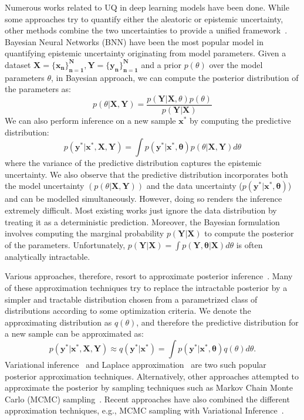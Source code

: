 Numerous works related to UQ in deep learning models have been done. While some approaches try to quantify either the aleatoric or epistemic uncertainty, other methods combine the two uncertainties to provide a unified framework~\cite{UncertDeepL, UncertDeepL2, UncertDeepNNSurvey}. Bayesian Neural Networks (BNN) have been the most popular model in quantifying epistemic uncertainty originating from model parameters. Given a dataset $\mathbf{X=\{x_n\}_{n=1}^N, Y=\{y_n\}_{n=1}^N}$ and a prior $p(\theta)$ over the model parameters $\theta$, in Bayesian approach, we can compute the posterior distribution of the parameters as: 
\begin{equation}\label{postdist}
    p(\theta|\mathbf{X, Y}) = \frac{p(\mathbf{Y|X}, \theta) p(\theta)}{p(\mathbf{Y|X})}
\end{equation}
We can also perform inference on a new sample $\mathbf{x^*}$ by computing the predictive distribution: 
\begin{equation}\label{preddist}
    p(\mathbf{y^*|x^*, X, Y}) = \int p(\mathbf{y^*|x^*, \theta}) p(\theta|\mathbf{X, Y})d\theta
\end{equation}
where the variance of the predictive distribution captures the epistemic uncertainty. We also observe that the predictive distribution incorporates both the model uncertainty $(p(\theta|\mathbf{X, Y}))$ and the data uncertainty ($p(\mathbf{y^*|x^*, \theta})$) and can be modelled simultaneously. However, doing so renders the inference extremely difficult. Most existing works just ignore the data distribution by treating it as a deterministic prediction. Moreover, the Bayesian formulation involves computing the marginal probability $p(\mathbf{Y|X})$ to compute the posterior of the parameters. Unfortunately, $p(\mathbf{Y|X}) = \int p(\mathbf{Y, \theta|X}) d\theta$ is often analytically intractable. 
\newline

Various approaches, therefore, resort to approximate posterior inference~\cite{VIPractical, VIReview, VIUncNN, CorrUncDNN, SVI, LaplaceApprox}. Many of these approximation techniques try to replace the intractable posterior by a simpler and tractable distribution chosen from a parametrized class of distributions according to some optimization criteria. We denote the approximating distribution as $q(\theta)$, and therefore the predictive distribution for a new sample can be approximated as: 
\begin{equation}\label{approxpreddist}
    p(\mathbf{y^*|x^*, X, Y}) \approx q(\mathbf{y^*|x^*}) = \int p(\mathbf{y^*|x^*, \theta}) q(\theta)d\theta.
\end{equation}
Variational inference~\cite{VIReview} and Laplace approximation~\cite{LaplaceApprox} are two such popular posterior approximation techniques. Alternatively, other approaches attempted to approximate the posterior by sampling techniques such as Markov Chain Monte Carlo (MCMC) sampling~\cite{ProbMLBook}. Recent approaches have also combined the different approximation techniques, e.g., MCMC sampling with Variational Inference~\cite{MCVIBridge}. 
\newline


